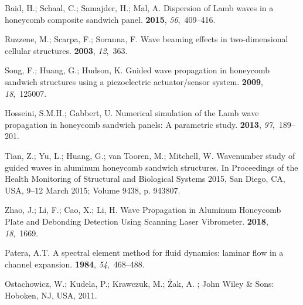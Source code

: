 \documentclass[sensors,article,accept,moreauthors,pdftex]{Definitions/mdpi}
\begin{document}
\begin{thebibliography}{999}
Baid, H.; Schaal, C.; Samajder, H.; Mal, A.
\newblock Dispersion of Lamb waves in a honeycomb composite sandwich panel.
 {\bf 2015}, {\em 56},~409--416.

Ruzzene, M.; Scarpa, F.; Soranna, F.
\newblock Wave beaming effects in two-dimensional cellular structures.
 {\bf 2003}, {\em 12},~363.

Song, F.; Huang, G.; Hudson, K.
\newblock Guided wave propagation in honeycomb sandwich structures using a
  piezoelectric actuator/sensor system.
 {\bf 2009}, {\em 18},~125007.

Hosseini, S.M.H.; Gabbert, U.
\newblock Numerical simulation of the Lamb wave propagation in honeycomb
  sandwich panels: A parametric study.
 {\bf 2013}, {\em 97},~189--201.

Tian, Z.; Yu, L.; Huang, G.; van Tooren, M.; Mitchell, W.
\newblock Wavenumber study of guided waves in aluminum honeycomb sandwich
  structures.
\newblock   In Proceedings of the Health Monitoring of Structural and Biological Systems 2015, San Diego, CA, USA, 9--12 March 2015; Volume 9438, p. 943807.%

Zhao, J.; Li, F.; Cao, X.; Li, H.
\newblock Wave Propagation in Aluminum Honeycomb Plate and Debonding Detection
  Using Scanning Laser Vibrometer.
 {\bf 2018}, {\em 18},~1669.

Patera, A.T.
\newblock A spectral element method for fluid dynamics: laminar flow in a
  channel expansion.
 {\bf 1984}, {\em 54},~468--488.

Ostachowicz, W.; Kudela, P.; Krawczuk, M.; {\.Z}ak, A.
; John Wiley \& Sons:  Hoboken, NJ, USA, 2011.%


\end{thebibliography}
\end{document}
